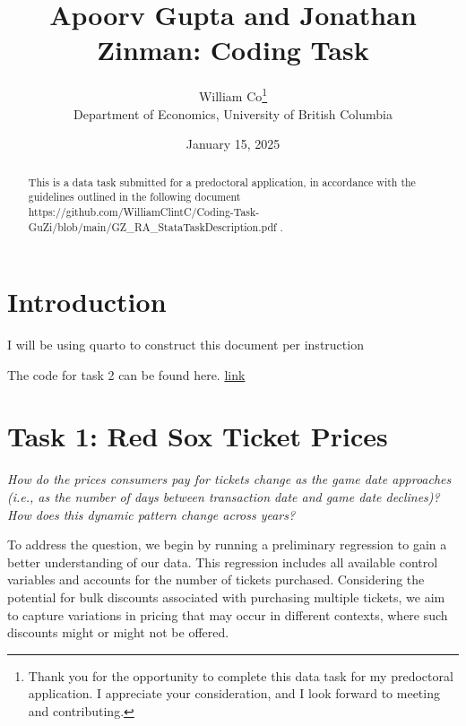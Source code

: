 \documentclass[
  12pt]{article}
\begin{document}
\def\spacingset#1{\renewcommand{\baselinestretch}%
{#1}\small\normalsize} \spacingset{1}



\date{January 15, 2025}
\title{\bf Apoorv Gupta and Jonathan Zinman: Coding Task}
\author{
William Co\thanks{Thank you for the opportunity to complete this data
task for my predoctoral application. I appreciate your consideration,
and I look forward to meeting and contributing.}\\
Department of Economics, University of British Columbia\\
}
\maketitle

\bigskip
\bigskip
\begin{abstract}
This is a data task submitted for a predoctoral application, in
accordance with the guidelines outlined in the following document
https://github.com/WilliamClintC/Coding-Task-GuZi/blob/main/GZ\_RA\_StataTaskDescription.pdf
.
\end{abstract}


\newpage
\spacingset{1.9} %

\section{Introduction}\label{introduction}

I will be using quarto to construct this document per instruction
\citep{coCodingTaskGuZiGZ_RA_StataTaskDescriptionpdfMain2025}

The code for task 2 can be found here.
\href{https://github.com/WilliamClintC/Coding-Task-GuZi/tree/main/lottery_study/code}{link}
\citep{coCodingTaskGuZiLottery_studyCode2025}

\section{Task 1: Red Sox Ticket
Prices}\label{task-1-red-sox-ticket-prices}

\emph{How do the prices consumers pay for tickets change as the game
date approaches (i.e., as the number of days between transaction date
and game date declines)? How does this dynamic pattern change across
years?}

To address the question, we begin by running a preliminary regression to
gain a better understanding of our data. This regression includes all
available control variables and accounts for the number of tickets
purchased. Considering the potential for bulk discounts associated with
purchasing multiple tickets, we aim to capture variations in pricing
that may occur in different contexts, where such discounts might or
might not be offered.
\end{document}
